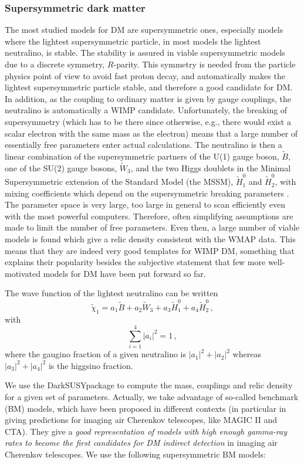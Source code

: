 \documentclass[10pt,aps,pra,reprint,amsmath,amsfonts,amssymb,showpacs,nofootinbib,floatfix]{revtex4-1}
\newcommand{\ds}{{\sc DarkSUSY}}
\begin{document}
\subsubsection{Supersymmetric dark matter}
The most studied models for DM are supersymmetric ones, especially
models where the lightest supersymmetric particle, in most models the
lightest neutralino, is stable. The stability is assured in viable
supersymmetric models due to a discrete symmetry, $R$-parity. This
symmetry is needed from the particle physics point of view to avoid
fast proton decay, and automatically makes the lightest supersymmetric
particle stable, and therefore a good candidate for DM. In addition,
as the coupling to ordinary matter is given by gauge couplings, the
neutralino is automatically a WIMP candidate. Unfortunately, the
breaking of supersymmetry (which has to be there since otherwise,
e.g., there would exist a scalar electron with the same mass as the
electron) means that a large number of essentially free parameters
enter actual calculations. The neutralino is then a linear
combination of the supersymmetric partners of the U(1) gauge boson,
$\tilde B$, one of the SU(2) gauge bosons, $\tilde W_3$, and the two
Higgs doublets in the Minimal Supersymmetric extension of the Standard
Model (the MSSM), $\tilde H_1^0$ and $\tilde H_2^0$, with mixing
coefficients which depend on the supersymmetric breaking parameters
\cite{1984NuPhB.238..453E}. The parameter space is very large, too
large in general to scan efficiently even with the most powerful
computers. Therefore, often simplifying assumptions are made to limit
the number of free parameters. Even then, a large number of viable
models is found which give a relic density consistent with the WMAP
data. This means that they are indeed very good templates for WIMP DM,
something that explains their popularity besides the subjective
statement that few more well-motivated models for DM have been put forward
so far.

The wave function of the lightest neutralino can be written
\begin{equation}
\tilde\chi_1=a_1\tilde B+a_2\tilde W_3+a_3 \tilde H_1^0+a_4\tilde H_2^0\,,
\end{equation}
with
\begin{equation}
\sum_{i=1}^4 |a_i|^2=1\,,
\end{equation}
where the gaugino fraction of a given neutralino is $|a_1|^2+|a_2|^2$
whereas $|a_3|^2+|a_4|^2$ is the higgsino fraction.

We use the \ds package \cite{ds} to compute the mass, couplings and
relic density for a given set of parameters. Actually, we take
advantage of so-called benchmark (BM) models, which have been proposed
in different contexts (in particular in \cite{2009JCAP...01..016B}
giving predictions for imaging air Cherenkov telescopes, like MAGIC II
and CTA). They give a {\em good representation of models with high
  enough gamma-ray rates to become the first candidates for DM
  indirect detection} in imaging air Cherenkov telescopes. We use the
following supersymmetric BM models:
\end{document}

